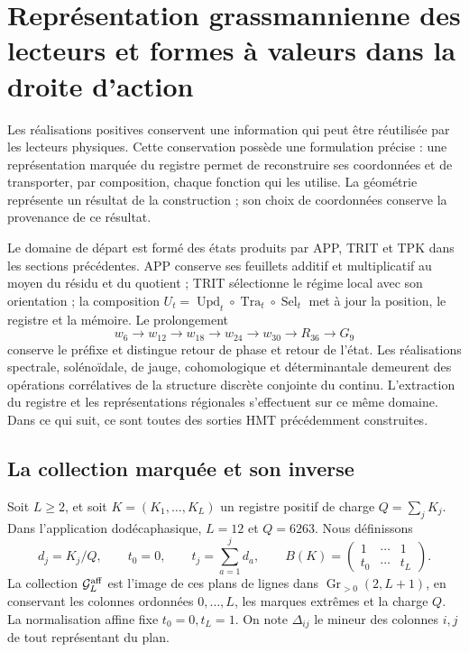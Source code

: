 \section{Représentation grassmannienne des lecteurs et formes à valeurs dans la droite d’action}
\label{sec:compat-lectores-formas}

Les réalisations positives conservent une information qui peut être réutilisée
par les lecteurs physiques. Cette conservation possède une formulation
précise : une représentation marquée du registre permet de reconstruire ses
coordonnées et de transporter, par composition, chaque fonction qui les utilise.
La géométrie représente un résultat de la construction ; son choix de
coordonnées conserve la provenance de ce résultat.

Le domaine de départ est formé des états produits par APP, TRIT et TPK dans les sections précédentes. APP conserve ses feuillets additif et multiplicatif au moyen du résidu et du quotient ; TRIT sélectionne le régime local avec son orientation ; la composition \(U_t=\operatorname{Upd}_t\circ\operatorname{Tra}_t\circ
\operatorname{Sel}_t\) met à jour la position, le registre et la mémoire. Le prolongement
\[
 w_6\longrightarrow w_{12}\longrightarrow w_{18}\longrightarrow
 w_{24}\longrightarrow w_{30}\longrightarrow R_{36}\longrightarrow G_9
\]
conserve le préfixe et distingue retour de phase et retour de l'état. Les réalisations spectrale, solénoïdale, de jauge, cohomologique et déterminantale demeurent des opérations corrélatives de la structure discrète conjointe du continu. L'extraction du registre et les représentations régionales s'effectuent sur ce même domaine. Dans ce qui suit, ce sont toutes des sorties HMT précédemment construites.

\subsection{La collection marquée et son inverse}

Soit \(L\geq2\), et soit \(K=(K_1,\ldots,K_L)\) un registre positif de charge \(Q=\sum_jK_j\). Dans l'application dodécaphasique, \(L=12\) et \(Q=6263\). Nous définissons
\[
 d_j=K_j/Q,\qquad t_0=0,\qquad
 t_j=\sum_{a=1}^{j}d_a,\qquad
 B(K)=\begin{pmatrix}1&\cdots&1\\t_0&\cdots&t_L\end{pmatrix}.
\]
La collection \(\mathcal G_L^{\rm aff}\) est l'image de ces plans de lignes dans \(\operatorname{Gr}_{>0}(2,L+1)\), en conservant les colonnes ordonnées \(0,\ldots,L\), les marques extrêmes et la charge \(Q\). La normalisation affine fixe \(t_0=0,t_L=1\). On note \(\Delta_{ij}\) le mineur des colonnes \(i,j\) de tout représentant du plan.


